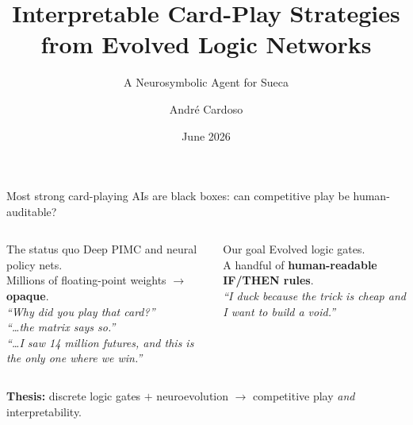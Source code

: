 \documentclass[10pt]{beamer}
\title{Interpretable Card-Play Strategies\\from Evolved Logic Networks}
\subtitle{A Neurosymbolic Agent for Sueca}
\author[A. Cardoso]{André Cardoso}
\institute[U. Aveiro]{DETI, Universidade de Aveiro}
\date{June 2026}
\begin{document}
\begin{frame}[plain]
  \maketitle
\end{frame}

\begin{frame}{Most strong card-playing AIs are black boxes: can competitive play be human-auditable?}
  \begin{columns}[T]
      \begin{block}{The status quo}
        \footnotesize
        Deep PIMC and neural policy nets.\\[6pt]
        Millions of floating-point weights $\rightarrow$ \textbf{opaque}.\\[6pt]
        \textit{``Why did you play that card?''}\\
        \textit{``\ldots the matrix says so.''}\\
        \textit{``\ldots I saw 14 million futures, and this is the only one where we win.''}
      \end{block}
      \begin{block}{Our goal}
        \footnotesize
        Evolved logic gates.\\[6pt]
        A handful of \textbf{human-readable IF/THEN rules}.\\[6pt]
        \textit{``I duck because the trick is cheap and I want to build a void.''}
      \end{block}
  \end{columns}
  \vspace{10pt}
  \centering
  \textbf{Thesis:} discrete logic gates $+$ neuroevolution $\rightarrow$ competitive play \textit{and} interpretability.
\end{frame}
\end{document}
